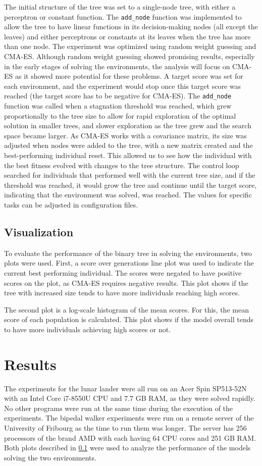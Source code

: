 The initial structure of the tree was set to a single-node tree, with either a perceptron or constant function. The \texttt{add\_node} function was implemented to allow the tree to have linear functions in its decision-making nodes (all except the leaves) and either perceptrons or constants at its leaves when the tree has more than one node. The experiment was optimized using random weight guessing and CMA-ES. Although random weight guessing showed promising results, especially in the early stages of solving the environments, the analysis will focus on CMA-ES as it showed more potential for these problems. A target score was set for each environment, and the experiment would stop once this target score was reached (the target score has to be negative for CMA-ES). The \texttt{add\_node} function was called when a stagnation threshold was reached, which grew proportionally to the tree size to allow for rapid exploration of the optimal solution in smaller trees, and slower exploration as the tree grew and the search space became larger. As CMA-ES works with a covariance matrix, its size was adjusted when nodes were added to the tree, with a new matrix created and the best-performing individual reset. This allowed us to see how the individual with the best fitness evolved with changes to the tree structure. The control loop searched for individuals that performed well with the current tree size, and if the threshold was reached, it would grow the tree and continue until the target score, indicating that the environment was solved, was reached. The values for specific tasks can be adjusted in configuration files.

\subsection{Visualization}
\label{visualization}
To evaluate the performance of the binary tree in solving the environments, two plots were used. First, a score over generations line plot was used to indicate the current best performing individual. The scores were negated to have positive scores on the plot, as CMA-ES requires negative results. This plot shows if the tree with increased size tends to have more individuals reaching high scores.

The second plot is a log-scale histogram of the mean scores. For this, the mean score of each population is calculated. This plot shows if the model overall tends to have more individuals achieving high scores or not.

\section{Results}
The experiments for the lunar lander were all run on an Acer Spin SP513-52N with an Intel Core i7-8550U CPU and 7.7 GB RAM, as they were solved rapidly. No other programs were run at the same time during the execution of the experiments. The bipedal walker experiments were run on a remote server of the University of Fribourg as the time to run them was longer. The server has 256 processors of the brand AMD with each having 64 CPU cores and 251 GB RAM. Both plots described in \ref{visualization} were used to analyze the performance of the models solving the two environments.

